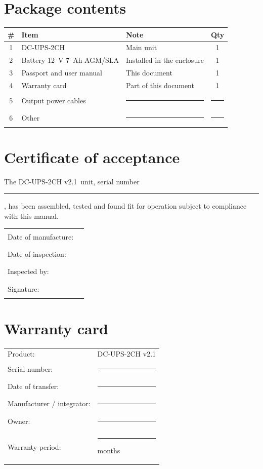 \documentclass[11pt,a4paper]{article}
\newcommand{\hwversion}{v2.1}%
\begin{document}
\section{Package contents}
\begin{tabularx}{\textwidth}{@{}clXc@{}}
\toprule
\# & \textbf{Item} & \textbf{Note} & \textbf{Qty} \\
\midrule
1 & DC-UPS-2CH & Main unit & 1 \\
2 & Battery 12~V 7~Ah AGM/SLA & Installed in the enclosure & 1 \\
3 & Passport and user manual & This document & 1 \\
4 & Warranty card & Part of this document & 1 \\
5 & Output power cables & \rule{55mm}{0.4pt} & \rule{10mm}{0.4pt} \\
6 & Other & \rule{55mm}{0.4pt} & \rule{10mm}{0.4pt} \\
\bottomrule
\end{tabularx}

\section{Certificate of acceptance}
The DC-UPS-2CH \hwversion\ unit, serial number \rule{50mm}{0.4pt}, has been assembled, tested and found fit for operation subject to compliance with this manual.

\vspace{5mm}
\begin{tabular}{@{}p{55mm}p{90mm}@{}}
Date of manufacture: & \rule{65mm}{0.4pt} \\
Date of inspection: & \rule{65mm}{0.4pt} \\
Inspected by: & \rule{65mm}{0.4pt} \\
Signature: & \rule{65mm}{0.4pt} \\
\end{tabular}

\newpage
\section{Warranty card}

\begin{tcolorbox}[colback=white,colframe=accent,boxrule=1pt,arc=2mm]
\begin{tabular}{@{}p{55mm}p{90mm}@{}}
Product: & DC-UPS-2CH \hwversion \\
Serial number: & \rule{65mm}{0.4pt} \\
Date of transfer: & \rule{65mm}{0.4pt} \\
Manufacturer / integrator: & \rule{65mm}{0.4pt} \\
Owner: & \rule{65mm}{0.4pt} \\
Warranty period: & \rule{30mm}{0.4pt} months \\
\end{tabular}
\end{tcolorbox}
\end{document}
